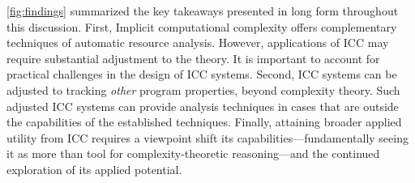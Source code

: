 \autoref{fig:findings} summarized the key takeaways presented in long form throughout this discussion.
First, Implicit computational complexity offers complementary techniques of automatic resource analysis.
However, applications of ICC may require substantial adjustment to the theory.
It is important to account for practical challenges in the design of ICC systems.
Second, ICC systems can be adjusted to tracking \emph{other} program properties, beyond complexity theory.
Such adjusted ICC systems can provide analysis techniques in cases that are outside the capabilities of the established techniques.
Finally, attaining broader applied utility from ICC requires a viewpoint shift \wrt its capabilities---\ie fundamentally seeing it as more than tool for complexity-theoretic reasoning---and the continued exploration of its applied potential.
